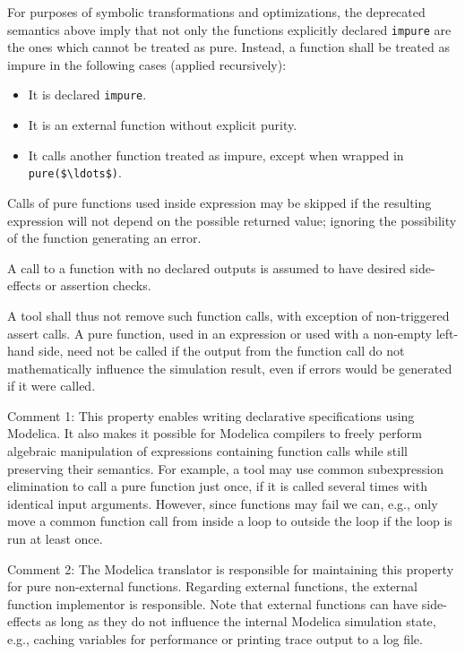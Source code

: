 For purposes of symbolic transformations and optimizations, the deprecated semantics above imply that not only the functions explicitly declared \lstinline!impure! are the ones which cannot be treated as pure.
Instead, a function shall be treated as impure in the following cases (applied recursively):
\begin{itemize}
\item
  It is declared \lstinline!impure!.
\item
  It is an external function without explicit purity.
\item
  It calls another function treated as impure, except when wrapped in \lstinline!pure($\ldots$)!.
\end{itemize}

Calls of pure functions used inside expression may be skipped if the resulting expression will not depend on the possible returned value; ignoring the possibility of the function generating an error.

A call to a function with no declared outputs is assumed to have desired side-effects or assertion checks.

\begin{nonnormative}
A tool shall thus not remove such function calls, with exception of non-triggered assert calls.
A pure function, used in an expression or used with a non-empty left-hand side, need not be called if the output from the function call do not mathematically influence the simulation result, even if errors would be generated if it were called.
\end{nonnormative}

\begin{nonnormative}
Comment 1: This property enables writing declarative specifications using Modelica.
It also makes it possible for Modelica compilers to freely perform algebraic manipulation of expressions containing function calls while still preserving their semantics.
For example, a tool may use common subexpression elimination to call a pure function just once, if it is called several times with identical input arguments.
However, since functions may fail we can, e.g., only move a common function call from inside a loop to outside the loop if the loop is run at least once.
\end{nonnormative}

\begin{nonnormative}
Comment 2: The Modelica translator is responsible for maintaining this property for pure non-external functions.
Regarding external functions, the external function implementor is responsible.
Note that external functions can have side-effects as long as they do not influence the internal Modelica simulation state, e.g., caching variables for performance or printing trace output to a log file.
\end{nonnormative}

